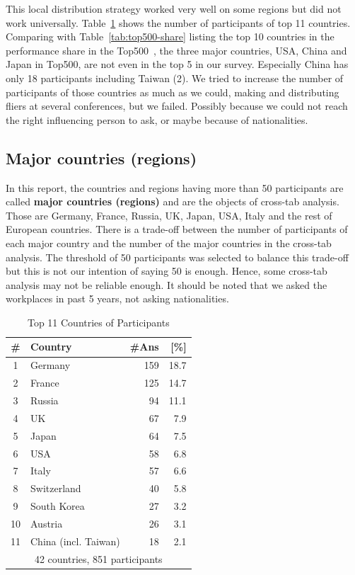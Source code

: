 \documentclass[preprint,5p,times]{elsarticle}
\begin{document}
This local distribution strategy worked very well on some regions but
did not work universally. Table~\ref{tab:countries} shows the number
of participants of top 11 countries.
Comparing with Table~\ref{tab:top500-share} listing the top 10
countries in the performance share in the Top500~\cite{Top500}, the
three major countries, USA, China and Japan in Top500, are not even in
the top 5 in our survey. Especially China has only 18 participants
including
Taiwan (2). We tried to increase the number of participants of those
countries as much as we could, making and distributing fliers at
several conferences, but we failed. Possibly because we could
not reach the right influencing person to ask, or maybe because of
nationalities.

\subsection*{Major countries (regions)}

In this report, the countries and regions having more than 50
participants are called {\bf major countries (regions)} and are the
objects of cross-tab analysis. Those are
Germany, France, Russia, UK, Japan, USA, Italy and
the rest of European countries.
There is a trade-off between the number of participants of
each major country
and the number of the major countries in the cross-tab analysis. The
threshold of 50 participants was selected to balance this trade-off
but this is not our intention of saying 50 is enough. Hence, some
cross-tab analysis may not be reliable enough.
It should be noted that we asked the
workplaces in past 5 years, not asking nationalities.
%
\begin{table}%
\begin{center}%
\caption{Top 11 Countries of Participants}%
\label{tab:countries}%
\begin{tabular}{c|l|r|r}%
  \hline%
  \# & Country & \#Ans & [\%] \\%
  \hline%
  1 & Germany 	& 159 & 18.7 \\%
  2 & France 	& 125 & 14.7 \\%
  3 & Russia 	& 94  & 11.1 \\%
  4 & UK 		& 67  &  7.9 \\%
  5 & Japan 	& 64  &  7.5 \\%
  6 & USA 	& 58  &  6.8 \\%
  7 & Italy 	& 57  &  6.6 \\%
  \hline%
  8 & Switzerland & 40  &  5.8 \\%
  9 & South Korea & 27  &  3.2 \\%
  10 & Austria 	& 26  &  3.1 \\%
  11 & China (incl. Taiwan) & 18 & 2.1 \\%
  \hline%
  \multicolumn{4}{c}{42 countries, 851 participants} \\%
\end{tabular}%
\end{center}%
\end{table}%
\end{document}
